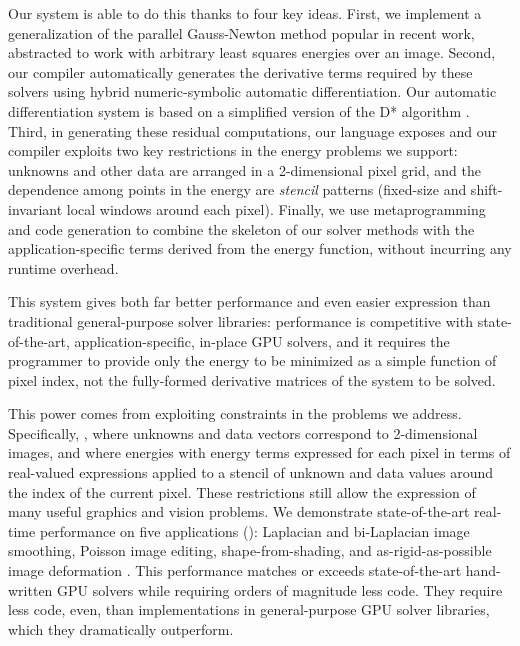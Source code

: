 Our system is able to do this thanks to four key ideas.
First, we implement a generalization of the parallel Gauss-Newton method popular in recent work, abstracted to work with arbitrary least squares energies over an image.
Second, our compiler automatically generates the derivative terms required by these solvers using hybrid numeric-symbolic automatic differentiation.
Our automatic differentiation system is based on a simplified version of the D* algorithm \cite{dstar}.
Third, in generating these residual computations, our language exposes and our compiler exploits two key restrictions in the energy problems we support: unknowns and other data are arranged in a 2-dimensional pixel grid, and the dependence among points in the energy are \emph{stencil} patterns (fixed-size and shift-invariant local windows around each pixel).
Finally, we use metaprogramming and code generation to combine the skeleton of our solver methods with the application-specific terms derived from the energy function, without incurring any runtime overhead.

This system gives both far better performance and even easier expression than traditional general-purpose solver libraries: performance is competitive with state-of-the-art, application-specific, in-place GPU solvers, and it requires the programmer to provide only the energy to be minimized as a simple function of pixel index, not the fully-formed derivative matrices of the system to be solved.

\FigAppSummary

This power comes from exploiting constraints in the problems we address.
Specifically, , where unknowns and data vectors correspond to 2-dimensional images, and where energies  with energy terms expressed for each pixel in terms of real-valued expressions applied to a stencil of unknown and data values around the index of the current pixel.
These restrictions still allow the expression of many useful graphics and vision problems.
We demonstrate state-of-the-art real-time performance on five applications (): Laplacian and bi-Laplacian image smoothing, Poisson image editing, shape-from-shading, and as-rigid-as-possible image deformation .
This performance matches or exceeds state-of-the-art hand-written GPU solvers while requiring orders of magnitude less code.
They require less code, even, than implementations in general-purpose GPU solver libraries, which they dramatically outperform.
